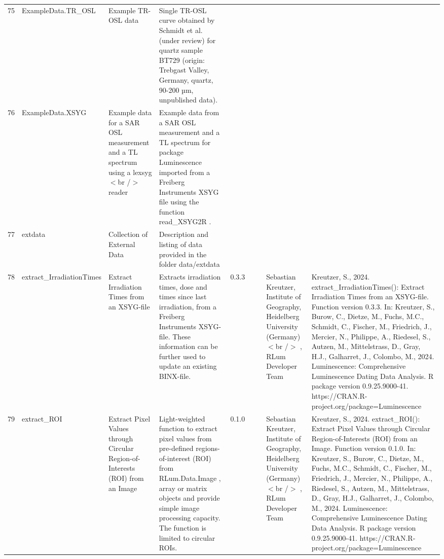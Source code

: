 \begin{table}[ht]
\begin{tabular}{rllllllll}
  75 & ExampleData.TR\_OSL & Example TR-OSL data & Single TR-OSL curve obtained by Schmidt et al. (under review) for quartz sample BT729 (origin: Trebgast Valley, Germany, quartz, 90-200 µm, unpublished data). &  &  &  &  &  \\ 
  76 & ExampleData.XSYG & Example data for a SAR OSL measurement and a TL spectrum using a lexsyg$<$br /$>$ reader & Example data from a SAR OSL measurement and a TL spectrum for package Luminescence imported from a Freiberg Instruments XSYG file using the function  read\_XSYG2R . &  &  &  &  &  \\ 
  77 & extdata & Collection of External Data & Description and listing of data provided in the folder  data/extdata &  &  &  &  &  \\ 
  78 & extract\_IrradiationTimes & Extract Irradiation Times from an XSYG-file & Extracts irradiation times, dose and times since last irradiation, from a Freiberg Instruments XSYG-file. These information can be further used to update an existing BINX-file. & 0.3.3
 &  &  & Sebastian Kreutzer, Institute of Geography, Heidelberg University (Germany)$<$br /$>$ , RLum Developer Team & Kreutzer, S., 2024. extract\_IrradiationTimes(): Extract Irradiation Times from an XSYG-file. Function version 0.3.3. In: Kreutzer, S., Burow, C., Dietze, M., Fuchs, M.C., Schmidt, C., Fischer, M., Friedrich, J., Mercier, N., Philippe, A., Riedesel, S., Autzen, M., Mittelstrass, D., Gray, H.J., Galharret, J., Colombo, M., 2024. Luminescence: Comprehensive Luminescence Dating Data Analysis. R package version 0.9.25.9000-41. https://CRAN.R-project.org/package=Luminescence
 \\ 
  79 & extract\_ROI & Extract Pixel Values through Circular Region-of-Interests (ROI) from an Image & Light-weighted function to extract pixel values from pre-defined regions-of-interest (ROI) from RLum.Data.Image ,  array  or  matrix  objects and provide simple image processing capacity. The function is limited to circular ROIs. & 0.1.0
 &  &  & Sebastian Kreutzer, Institute of Geography, Heidelberg University (Germany)$<$br /$>$ , RLum Developer Team & Kreutzer, S., 2024. extract\_ROI(): Extract Pixel Values through Circular Region-of-Interests (ROI) from an Image. Function version 0.1.0. In: Kreutzer, S., Burow, C., Dietze, M., Fuchs, M.C., Schmidt, C., Fischer, M., Friedrich, J., Mercier, N., Philippe, A., Riedesel, S., Autzen, M., Mittelstrass, D., Gray, H.J., Galharret, J., Colombo, M., 2024. Luminescence: Comprehensive Luminescence Dating Data Analysis. R package version 0.9.25.9000-41. https://CRAN.R-project.org/package=Luminescence

\end{tabular}
\end{table}
